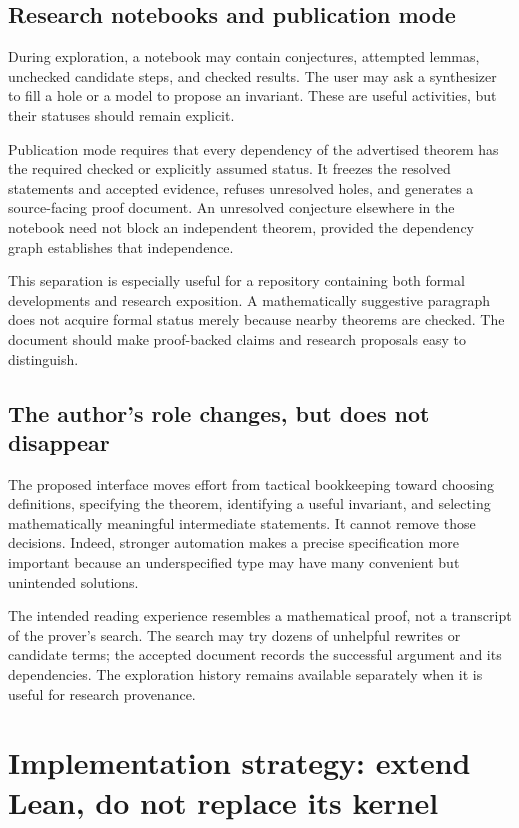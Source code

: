 \documentclass[11pt,a4paper]{article}
\theoremstyle{remark}
\begin{document}
\subsection{Research notebooks and publication mode}

During exploration, a notebook may contain conjectures, attempted lemmas, unchecked candidate steps, and checked results. The user may ask a synthesizer to fill a hole or a model to propose an invariant. These are useful activities, but their statuses should remain explicit.

Publication mode requires that every dependency of the advertised theorem has the required checked or explicitly assumed status. It freezes the resolved statements and accepted evidence, refuses unresolved holes, and generates a source-facing proof document. An unresolved conjecture elsewhere in the notebook need not block an independent theorem, provided the dependency graph establishes that independence.

This separation is especially useful for a repository containing both formal developments and research exposition. A mathematically suggestive paragraph does not acquire formal status merely because nearby theorems are checked. The document should make proof-backed claims and research proposals easy to distinguish.

\subsection{The author's role changes, but does not disappear}

The proposed interface moves effort from tactical bookkeeping toward choosing definitions, specifying the theorem, identifying a useful invariant, and selecting mathematically meaningful intermediate statements. It cannot remove those decisions. Indeed, stronger automation makes a precise specification more important because an underspecified type may have many convenient but unintended solutions.

The intended reading experience resembles a mathematical proof, not a transcript of the prover's search. The search may try dozens of unhelpful rewrites or candidate terms; the accepted document records the successful argument and its dependencies. The exploration history remains available separately when it is useful for research provenance.

\section{Implementation strategy: extend Lean, do not replace its kernel}
\label{sec:implementation}
\end{document}
